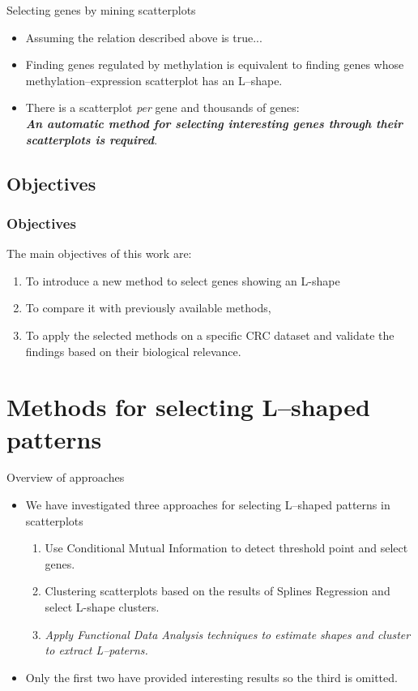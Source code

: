 \documentclass[handout]{beamer}
\begin{document}
\begin{frame}{Selecting genes by mining scatterplots}
  \begin{itemize}
  \item Assuming the relation described above is true...
\item Finding genes regulated by methylation is equivalent to finding genes whose methylation--expression scatterplot has an L--shape.
\item There is a scatterplot \emph{per} gene and thousands of genes:\\ \textbf{\emph{An automatic method for selecting interesting genes through their scatterplots is required}}.
  \end{itemize}
\end{frame}


\subsection{Objectives}

\begin{frame}[fragile]\frametitle{Objectives}
The main objectives of this work are:
\begin{enumerate}

\item To introduce a new method to select genes showing an L-shape
\item To compare it with previously available methods, 
\item To apply the selected methods on a specific CRC dataset and validate the findings based on their biological relevance.

\end{enumerate}

\end{frame}

\section{Methods for selecting L--shaped patterns}

\begin{frame}{Overview of approaches}
\begin{itemize}
\item We have investigated three approaches for selecting L--shaped patterns in scatterplots
\begin{enumerate}
\item Use Conditional Mutual Information to detect threshold point and select genes.
\item Clustering scatterplots based on the results of Splines Regression and select L-shape clusters.
\item \emph{Apply Functional Data Analysis techniques to estimate shapes and cluster to extract L--paterns.}
\end{enumerate}
\item Only the first two have provided interesting results so the third is omitted.
\end{itemize}
\end{frame}
\end{document}

